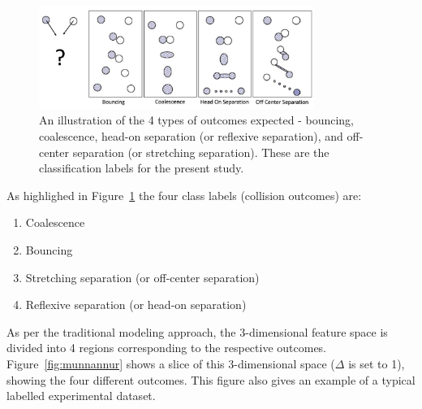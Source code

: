 \documentclass{article}
\begin{document}
\begin{figure}[h]
	\centering
	\includegraphics[width=0.8\textwidth]{figures/outcome-illustration.png}
	\caption{An illustration of the 4 types of outcomes expected - bouncing, coalescence, head-on separation (or reflexive separation), and off-center separation (or stretching separation). These are the classification labels for the present study.}
	\label{fig:outcomes}
\end{figure}
As highlighed in Figure~\ref{fig:outcomes} the four class labels (collision outcomes) are:
\begin{enumerate}
\item Coalescence
\item Bouncing
\item Stretching separation (or off-center separation)
\item Reflexive separation (or head-on separation)
\end{enumerate}

As per the traditional modeling approach, the 3-dimensional feature space is divided into 4 regions corresponding to the respective outcomes. Figure~\ref{fig:munnannur} shows a slice of this 3-dimensional space ($\Delta$ is set to 1), showing the four different outcomes. This figure also gives an example of a typical labelled experimental dataset. 


\end{document}
